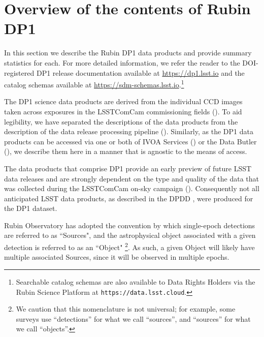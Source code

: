 \section{Overview of the contents of Rubin \gls{DP1}}
\label{sec:data_products}
In this section we describe the Rubin \gls{DP1} data products and provide summary statistics for each.
For more detailed information, we refer the reader to the DOI-registered \gls{DP1} release documentation available at \url{https://dp1.lsst.io} and the catalog schemas available at \url{https://sdm-schemas.lsst.io}.\footnote{Searchable catalog schemas are also available to Data Rights Holders via the Rubin Science Platform at \nolinkurl{https://data.lsst.cloud}.}

The \gls{DP1} science data products are derived from the \nvisitimages individual \gls{CCD} images taken across \nexposures exposures in the \nfields \gls{LSSTComCam} commissioning fields ().
To aid legibility, we have separated the descriptions of the data products from the description of the data release processing pipeline ().
Similarly, as the \gls{DP1} data products can be accessed via one or both of \gls{IVOA} Services () or the Data \gls{Butler} (), we describe them here in a manner that is agnostic to the means of access.

The data products that comprise \gls{DP1} provide an early preview of future LSST data releases and are strongly dependent on the type and quality of the data that was collected during the \gls{LSSTComCam} on-sky campaign ().
Consequently not all anticipated  \gls{LSST} data products, as described in the \gls{DPDD} \citep{LSE-163}, were produced for the \gls{DP1} dataset.

Rubin Observatory has adopted the convention by which single-epoch detections are referred to as ``Sources", and the astrophysical object associated with a given detection is referred to as an ``Object"
\footnote{We caution that this nomenclature is not universal; for example, some surveys use ``detections'' for what we call ``sources'', and ``sources'' for what we call ``objects''.}.
As such, a given Object will likely have multiple associated  Sources, since it will be observed in multiple epochs.


